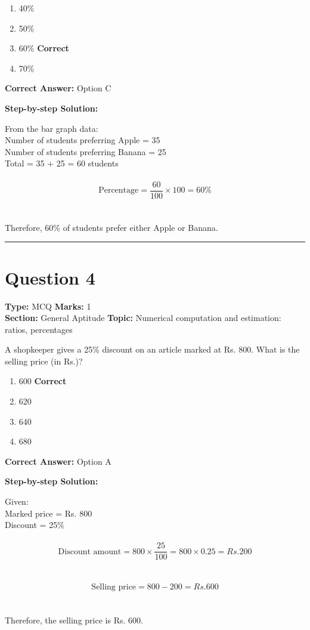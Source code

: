 \documentclass[11pt]{article}
\begin{document}
\begin{enumerate}[label=\textbf{\Alph*.}, leftmargin=1.8em]
\item 40\%\item 50\%\item 60\% \hfill {\color{gategreen}\textbf{Correct}}\item 70\%\end{enumerate}

\textbf{Correct Answer:} Option C

\textbf{Step-by-step Solution:}

From the bar graph data:\\
 Number of students preferring Apple = 35\\
 Number of students preferring Banana = 25\\
 Total = 35 + 25 = 60 students\\
\\
\[\text{Percentage} = \frac{60}{100} \times 100 = 60\%\]\\
\\
 Therefore, 60\% of students prefer either Apple or Banana.

\vspace{0.8em}
\hrule
\vspace{0.4em}
\section*{Question 4}
\textbf{Type:} MCQ \hfill \textbf{Marks:} 1\\
\textbf{Section:} General Aptitude \hfill \textbf{Topic:} Numerical computation and estimation: ratios, percentages

A shopkeeper gives a 25\% discount on an article marked at Rs. 800. What is the selling price (in Rs.)?


\begin{enumerate}[label=\textbf{\Alph*.}, leftmargin=1.8em]
\item 600 \hfill {\color{gategreen}\textbf{Correct}}\item 620\item 640\item 680\end{enumerate}

\textbf{Correct Answer:} Option A

\textbf{Step-by-step Solution:}

Given:\\
 Marked price = Rs. 800\\
 Discount = 25\%\\
\\
\[\text{Discount amount} = 800 \times \frac{25}{100} = 800 \times 0.25 = Rs. 200\]\\
\\
\[\text{Selling price} = 800 - 200 = Rs. 600\]\\
\\
 Therefore, the selling price is Rs. 600.
\end{document}
